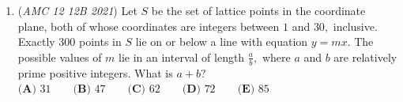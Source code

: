 \begin{enumerate}
	\item (\textit{AMC 12 12B 2021}) Let $S$ be the set of lattice points in the coordinate plane, both of whose coordinates are integers between $1$ and $30,$ inclusive. Exactly $300$ points in $S$ lie on or below a line with equation $y=mx.$ The possible values of $m$ lie in an interval of length $\frac ab,$ where $a$ and $b$ are relatively prime positive integers. What is $a+b?$
$\textbf{(A) }31 \qquad \textbf{(B) }47 \qquad \textbf{(C) }62\qquad \textbf{(D) }72 \qquad \textbf{(E) }85$


\end{enumerate}